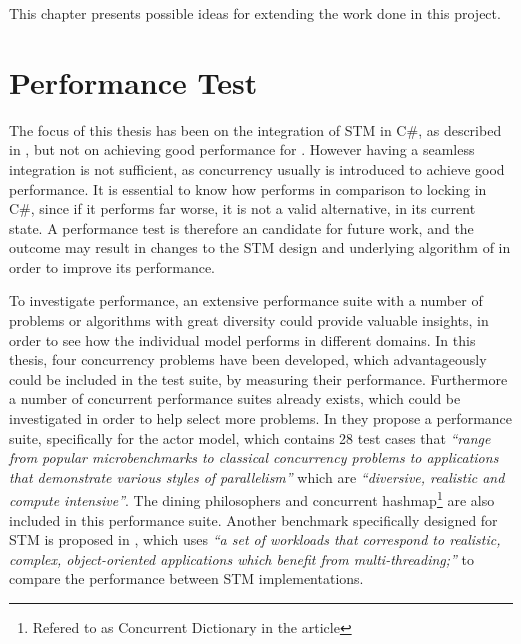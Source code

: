 \makeatletter {}\makeatother
{}
This chapter presents possible ideas for extending the work done in this project. 

\label{chap:future_work}
\section{Performance Test}
The focus of this thesis has been on the integration of \ac{STM} in C\#, as described in , but not on achieving good performance for \stmname.
However having a seamless integration is not sufficient, as concurrency usually is introduced to achieve good performance. It is essential to know how \stmname performs in comparison to locking in C\#, since if it performs far worse, it is not a valid alternative, in its current state. A performance test is therefore an candidate for future work, and the outcome may result in changes to the \ac{STM} design and underlying algorithm of \stmname in order to improve its performance.

To investigate performance, an extensive performance suite with a number of problems or algorithms with great diversity could provide valuable insights, in order to see how the individual model performs in different domains. In this thesis, four concurrency problems have been developed, which advantageously could be included in the test suite, by measuring their performance. Furthermore a number of concurrent performance suites already exists, which could be investigated in order to help select more problems. In \cite{imam2014savina} they propose a performance suite, specifically for the actor model, which contains 28 test cases that \textit{``range from popular microbenchmarks to classical concurrency problems to applications that demonstrate various styles of parallelism''} which are \textit{``diversive, realistic and compute intensive''}. The dining philosophers and concurrent hashmap\footnote{Refered to as Concurrent Dictionary in the article} are also included in this performance suite. Another benchmark specifically designed for \ac{STM} is proposed in \cite{guerraoui2006stmbench7}, which uses \textit{``a set of workloads that correspond to realistic, complex, object-oriented applications which benefit from multi-threading;''} to compare the performance between \ac{STM} implementations. 

